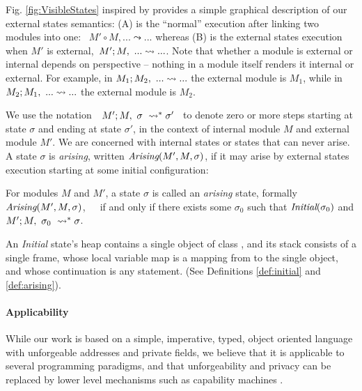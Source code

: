 Fig. \ref{fig:VisibleStates} inspired by  provides a simple graphical description of 
our external states semantics: (A) is the ``normal'' execution after 
linking two modules into one: \ $M' \circ M, ... \leadsto ...$ whereas (B) is the
 external states execution when $M'$ is external,\   $M' ; M,\ ... \leadsto ...$.
Note that whether a module is external or internal depends on %
perspective -- nothing in a module itself renders it internal or external. For example, in
 $M_1 ; M_2,\ ... \leadsto ...$ the external module is $M_1$,
  while in  $M_2 ; M_1,\ ... \leadsto ...$  the external module is $M_2$.

We  use the notation\ \  $M' ; M,\ \sigma\ \leadsto^* \sigma'$ \ 
to denote zero or more  steps starting at state $\sigma$ and ending at state $\sigma'$, in the context of internal module 
$M$ and external module $M'$.
We are \jm[]{not} concerned with internal states or states that can never arise.
{A state $\sigma$ is \emph{arising},}  written $\textit{Arising}(M', M, \sigma)$, {if it  may arise by external states} execution
starting at some initial configuration:



\begin{definition}
\label{def:arising}
For   modules $M$ and  $M'$, a %
 state $\sigma$ is 
called an \emph{arising} state, formally \ \ \ $\textit{Arising}(M', M, \sigma)$,\ \ \ 
if and only if there exists some $\sigma_0$ such that $\textit{Initial}(\sigma_0)$ and
$M' ; M,\ \sigma_0\ \leadsto^* \sigma$.
\end{definition}

An \emph{Initial} state's heap
contains a single object of class , and
its  stack   consists of a single frame, whose local variable map is a
mapping from \prg{this} to the single object, and whose continuation is  any statement.
(See Definitions \ref{def:initial} and \ref{def:arising}).


\paragraph{Applicability} 
{While our work is based on 
  a simple, imperative, typed, object oriented}
language with unforgeable addresses and private fields, we believe
 that %
 it is applicable to several programming paradigms, and 
 that   unforgeability and privacy
 can be replaced 
 by lower level mechanisms such as capability machines \cite{vanproving,davis2019cheriabi}.

